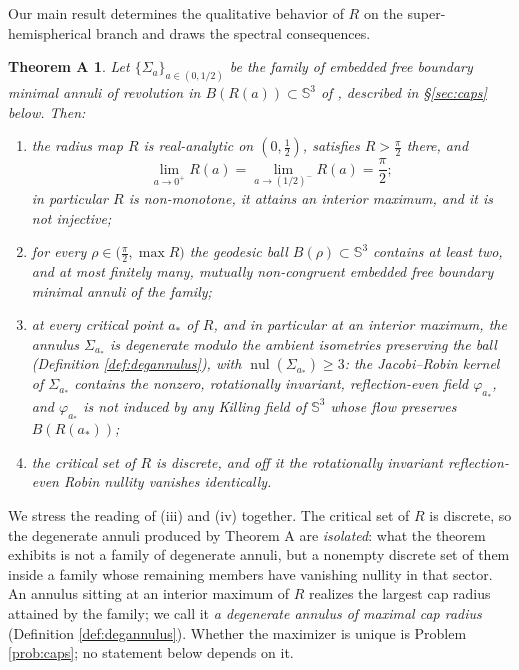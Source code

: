 \documentclass[10pt,a4paper]{amsart}
\newtheorem*{thmA}{Theorem A}
\newcommand{\Sph}{\mathbb{S}}
\newcommand{\nul}{\operatorname{nul}}
\begin{document}
Our main result determines the qualitative behavior of $R$ on the super-hemispherical branch and draws the spectral consequences.

\begin{thmA}
Let $\{\Sigma_a\}_{a\in(0,1/2)}$ be the family of embedded free boundary minimal annuli of revolution in $B(R(a))\subset\Sph^3$ of \textup{\cite[Prop. 3.3 and Prop. 3.4]{dO24}}, described in \S\textup{\ref{sec:caps}} below. Then:
\begin{enumerate}
\item[\textup{(i)}] the radius map $R$ is real-analytic on $(0,\tfrac12)$, satisfies $R>\tfrac\pi2$ there, and
\[
\lim_{a\to 0^+}R(a)=\lim_{a\to (1/2)^-}R(a)=\frac\pi2 ;
\]
in particular $R$ is non-monotone, it attains an interior maximum, and it is not injective;
\item[\textup{(ii)}] for every $\rho\in\bigl(\tfrac\pi2,\max R\bigr)$ the geodesic ball $B(\rho)\subset\Sph^3$ contains at least two, and at most finitely many, mutually non-congruent embedded free boundary minimal annuli of the family;
\item[\textup{(iii)}] at every critical point $a_*$ of $R$, and in particular at an interior maximum, the annulus $\Sigma_{a_*}$ is degenerate modulo the ambient isometries preserving the ball (Definition \ref{def:degannulus}), with $\nul(\Sigma_{a_*})\geq 3$: the Jacobi--Robin kernel of $\Sigma_{a_*}$ contains the nonzero, rotationally invariant, reflection-even field $\varphi_{a_*}$, and $\varphi_{a_*}$ is \emph{not} induced by any Killing field of $\Sph^3$ whose flow preserves $B(R(a_*))$;
\item[\textup{(iv)}] the critical set of $R$ is discrete, and off it the rotationally invariant reflection-even Robin nullity vanishes identically.
\end{enumerate}
\end{thmA}

We stress the reading of (iii) and (iv) together. The critical set of $R$ is discrete, so the degenerate annuli produced by Theorem A are \emph{isolated}: what the theorem exhibits is not a family of degenerate annuli, but a nonempty discrete set of them inside a family whose remaining members have vanishing nullity in that sector. An annulus sitting at an interior maximum of $R$ realizes the largest cap radius attained by the family; we call it \emph{a degenerate annulus of maximal cap radius} (Definition \ref{def:degannulus}). Whether the maximizer is unique is Problem \ref{prob:caps}; no statement below depends on it.
\end{document}
